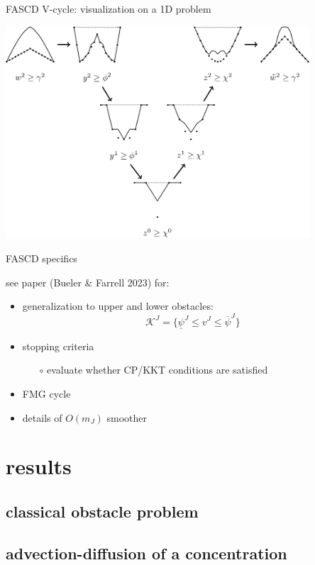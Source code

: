 \documentclass[svgnames,
               hyperref={colorlinks,citecolor=DeepPink4,linkcolor=FireBrick,urlcolor=Maroon},
               usepdftitle=false]  %
               {beamer}
\begin{document}
\begin{frame}{FASCD V-cycle: visualization on a 1D problem}

\centering
\includegraphics[width=0.85\textwidth]{figs/vcycle-visualized.png}
\end{frame}


\begin{frame}{FASCD specifics}

see paper (Bueler \& Farrell 2023) for:
\begin{itemize}
\item generalization to upper and lower obstacles:
    $$\mathcal{K}^J = \{\underline{\psi}^J \le v^J \le \overline{\psi}^J\}$$
\item stopping criteria
    \begin{itemize}
    \item[$\circ$] evaluate whether CP/KKT conditions are satisfied
    \end{itemize}
\item FMG cycle
\item details of $O(m_J)$ smoother
\end{itemize}
\end{frame}


\section{results}

\subsection{classical obstacle problem}

\subsection{advection-diffusion of a concentration}
\end{document}
